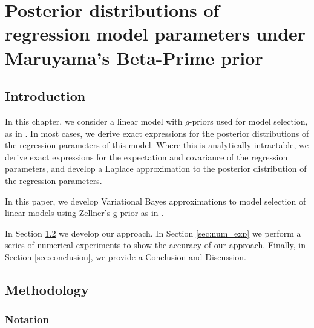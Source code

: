 \chapter{Posterior distributions of regression model parameters under Maruyama's Beta-Prime prior}

\section{Introduction}

In this chapter, we consider
a linear model with $g$-priors used for model selection, as in \citep{Maruyama2011}. 
In most cases, we derive exact expressions for the posterior distributions of the regression parameters of
this model. Where this is analytically intractable, we derive exact expressions for the expectation and
covariance of the regression parameters, and develop a Laplace approximation to the posterior distribution
of the regression parameters.




In this paper, we develop Variational Bayes approximations to model selection of linear models using Zellner's
g prior as in \citep{Liang2008}.


In Section \ref{sec:methodology} we develop our approach. In Section
\ref{sec:num_exp} we perform a series of numerical experiments to show the accuracy of our approach. Finally,
in Section \ref{sec:conclusion}, we provide a Conclusion and Discussion.

\section{Methodology}
\label{sec:methodology}

\subsection{Notation}

